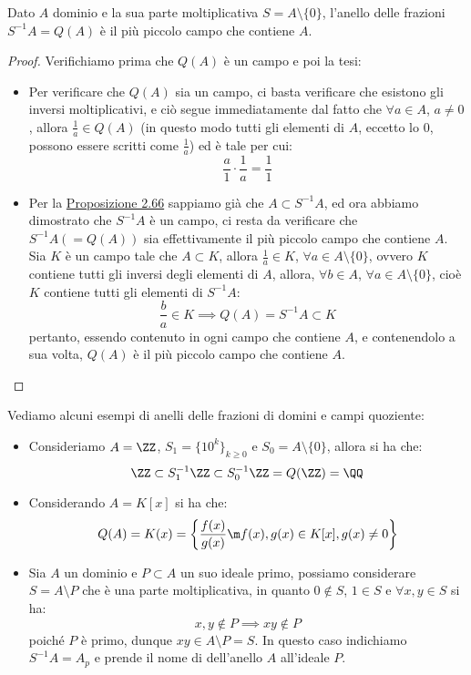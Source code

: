 \documentclass[11pt]{scrartcl}
\begin{document}
\begin{proposition}
    [$A \subset Q(A)$]
    \label{2.69}
    Dato $A$ dominio e la sua parte moltiplicativa $S = A\setminus\{0\}$, l'anello delle frazioni $S^{-1}A = Q(A)$ è il più 
    piccolo campo che contiene $A$.
\end{proposition}

\begin{proof}
    Verifichiamo prima che $Q(A)$ è un campo e poi la tesi:
    \begin{itemize}
        \item Per verificare che $Q(A)$ sia un campo, ci basta verificare che esistono gli inversi moltiplicativi, e ciò segue immediatamente
         dal fatto che $\forall a \in A$, $a \ne 0$, allora $\displaystyle\frac{1}{a} \in Q(A)$ (in questo modo tutti gli elementi di $A$, eccetto lo 0,
         possono essere scritti come $\displaystyle\frac{1}{a}$) ed è tale per cui:
            \[ \frac{a}{1} \cdot \frac{1}{a} = \frac{1}{1}
                \]
        \item Per la \hyperref[2.66]{Proposizione 2.66} sappiamo già che $A \subset S^{-1}A$, ed ora abbiamo dimostrato che $S^{-1}A$ è un campo, ci resta da verificare 
        che $S^{-1}A (= Q(A))$ sia effettivamente il più piccolo campo che contiene $A$. Sia $K$ è un campo tale che $A \subset K$, allora $\displaystyle \frac{1}{a} \in K$, $\forall a \in A \setminus\{0\}$, ovvero $K$ 
        contiene tutti gli inversi degli elementi di $A$, allora, $\forall b \in A$, $\forall a \in A \setminus \{0\}$, cioè $K$ contiene tutti gli elementi di $S^{-1}A$:
            \[ \frac{b}{a} \in K \implies Q(A) = S^{-1}A \subset K
                \]
        pertanto, essendo contenuto in ogni campo che contiene $A$, e contenendolo a sua volta, $Q(A)$ è il più piccolo campo che contiene $A$.
    \end{itemize}
\end{proof}

\begin{example}
    Vediamo alcuni esempi di anelli delle frazioni di domini e campi quoziente:
    \begin{itemize}
        \item Consideriamo $A = \ZZ$, $S_1 = \{10^k\}_{k\geq 0}$ e $S_0 = A \setminus\{0\}$, allora si ha che:
            \[ \ZZ \subset S_1^{-1}\ZZ \subset S_0^{-1}\ZZ = Q(\ZZ) = \QQ
                \]
        \item Considerando $A = K[x]$ si ha che:
            \[ Q(A) = K(x) = \left\{\frac{f(x)}{g(x)} \m f(x),g(x) \in K[x], g(x) \ne 0\right\}
                \]
        \item Sia $A$ un dominio e $P \subset A$ un suo ideale primo, possiamo considerare $S = A \setminus P$ che è una parte moltiplicativa, in quanto 
            $0 \not\in S$, $1 \in S$ e $\forall x,y \in S$ si ha:
            \[ x,y \not\in P \implies xy \not\in P
                \]
            poiché $P$ è primo, dunque $xy \in A \setminus P = S$. In questo caso indichiamo $S^{-1}A = A_p$ e prende il nome di  dell'anello $A$ all'ideale $P$.
    \end{itemize}
\end{example}
\end{document}
